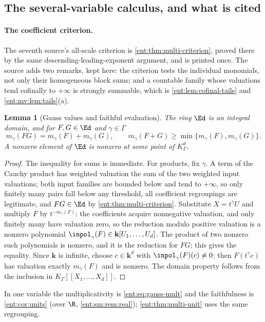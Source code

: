 \documentclass[11pt]{article}
\theoremstyle{plain}
\newtheorem{lemma}[lemma]{Lemma}
\theoremstyle{plain}
\theoremstyle{plain}
\theoremstyle{definition}
\theoremstyle{definition}
\theoremstyle{definition}
\theoremstyle{definition}
\theoremstyle{remark}
\newcommand{\K}{K_\Gamma}\newcommand{\KD}{K_\Delta}
\newcommand{\kk}{\mathbf k}\newcommand{\PP}{\mathbb P}
\begin{document}
\subsection{The several-variable calculus, and what is cited}
\label{ent:rc:subsec:calculus}

\paragraph{The coefficient criterion.} The seventh source's all-scale
criterion is \cref{ent:thm:multi-criterion}, proved there by the same
descending-leading-exponent argument, and is printed once. The source adds
two remarks, kept here: the criterion tests the individual monomials, not only
their homogeneous block sums; and a countable family whose valuations tend
cofinally to $+\infty$ is strongly summable, which is
\cref{ent:lem:cofinal-tails} and \cref{ent:mv:lem:tails}(a).

\begin{lemma}[Gauss values and faithful evaluation]\label{ent:rc:lem:gauss}
The ring $\Ed$ is an integral domain, and for $F,G\in\Ed$ and
$\gamma\in\Gamma$
\[
 m_\gamma(FG)=m_\gamma(F)+m_\gamma(G),\qquad
 m_\gamma(F+G)\ge\min\{m_\gamma(F),m_\gamma(G)\}.
\]
A nonzero element of $\Ed$ is nonzero at some point of $\K^d$.
\end{lemma}
\begin{proof}
The inequality for sums is immediate. For products, fix $\gamma$. A term of
the Cauchy product has weighted valuation the sum of the two weighted input
valuations; both input families are bounded below and tend to $+\infty$, so
only finitely many pairs fall below any threshold, all coefficient
regroupings are legitimate, and $FG\in\Ed$ by
\cref{ent:thm:multi-criterion}. Substitute $X=t^\gamma U$ and multiply $F$ by
$t^{-m_\gamma(F)}$: the coefficients acquire nonnegative valuation, and only
finitely many have valuation zero, so the reduction modulo positive valuation
is a nonzero polynomial $\inpol_\gamma(F)\in\kk[U_1,\ldots,U_d]$. The product
of two nonzero such polynomials is nonzero, and it is the reduction for $FG$;
this gives the equality. Since $\kk$ is infinite, choose $c\in\kk^d$ with
$\inpol_\gamma(F)(c)\ne0$; then $F(t^\gamma c)$ has valuation exactly
$m_\gamma(F)$ and is nonzero. The domain property follows from the inclusion
in $\K[[X_1,\ldots,X_d]]$.
\end{proof}

In one variable the multiplicativity is \eqref{ent:eq:gauss-mult} and the
faithfulness is \cref{ent:cor:units} (over $\R$,
\cref{ent:sm:rem:real}); \cref{ent:thm:multi-unit} uses the same regrouping.
\end{document}

